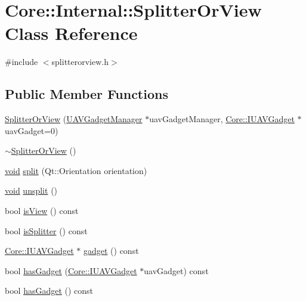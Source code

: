 \hypertarget{class_core_1_1_internal_1_1_splitter_or_view}{\section{\-Core\-:\-:\-Internal\-:\-:\-Splitter\-Or\-View \-Class \-Reference}
\label{class_core_1_1_internal_1_1_splitter_or_view}
}


{\ttfamily \#include $<$splitterorview.\-h$>$}

\subsection*{\-Public \-Member \-Functions}
\begin{DoxyCompactItemize}
\item 
\hyperlink{group___core_plugin_ga0cde2ec154e958879a859372bbc74e36}{\-Splitter\-Or\-View} (\hyperlink{class_core_1_1_u_a_v_gadget_manager}{\-U\-A\-V\-Gadget\-Manager} $\ast$uav\-Gadget\-Manager, \hyperlink{class_core_1_1_i_u_a_v_gadget}{\-Core\-::\-I\-U\-A\-V\-Gadget} $\ast$uav\-Gadget=0)
\item 
\hyperlink{group___core_plugin_ga42605d72009aca0f129477fe21bf7d32}{$\sim$\-Splitter\-Or\-View} ()
\item 
\hyperlink{group___u_a_v_objects_plugin_ga444cf2ff3f0ecbe028adce838d373f5c}{void} \hyperlink{group___core_plugin_gae258b7ec5e2f7777bbdeee7304e1d79a}{split} (\-Qt\-::\-Orientation orientation)
\item 
\hyperlink{group___u_a_v_objects_plugin_ga444cf2ff3f0ecbe028adce838d373f5c}{void} \hyperlink{group___core_plugin_gaff0d2db70952dd90a8a9eaf4c84ae66f}{unsplit} ()
\item 
bool \hyperlink{group___core_plugin_gac5f0d73d9c3c17c18b5175bc96676b39}{is\-View} () const 
\item 
bool \hyperlink{group___core_plugin_ga6b5dd4764ff19447ec887f2b48bce54e}{is\-Splitter} () const 
\item 
\hyperlink{class_core_1_1_i_u_a_v_gadget}{\-Core\-::\-I\-U\-A\-V\-Gadget} $\ast$ \hyperlink{group___core_plugin_gaf1fee806596e173c1a7aac4bd0864565}{gadget} () const 
\item 
bool \hyperlink{group___core_plugin_gad86937a62c61ad121f86911083513f35}{has\-Gadget} (\hyperlink{class_core_1_1_i_u_a_v_gadget}{\-Core\-::\-I\-U\-A\-V\-Gadget} $\ast$uav\-Gadget) const 
\item 
bool \hyperlink{group___core_plugin_ga988eeacf124937c7e90853f95af39ce3}{has\-Gadget} () const 

\end{DoxyCompactItemize}
